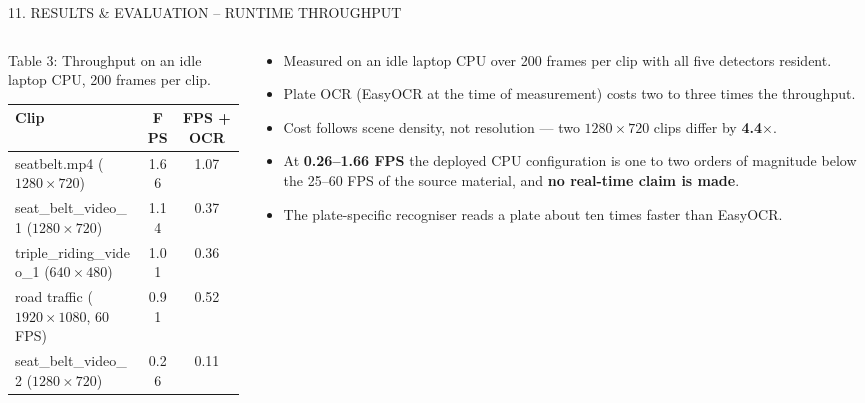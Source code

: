 \documentclass[aspectratio=169,10pt,t]{beamer}
\begin{document}
\begin{frame}{11. RESULTS \& EVALUATION -- RUNTIME THROUGHPUT}
\begin{columns}[T,onlytextwidth]
\begin{column}{0.5\textwidth}
\centering
{\tiny Table 3: Throughput on an idle laptop CPU, 200 frames per clip.}\\[0.2em]
\scriptsize
\begin{tabular}{@{}lcc@{}}
\toprule
\textbf{Clip} & \textbf{FPS} & \textbf{FPS + OCR}\\
\midrule
seatbelt.mp4 ($1280\times720$) & 1.66 & 1.07\\
seat\_belt\_video\_1 ($1280\times720$) & 1.14 & 0.37\\
triple\_riding\_video\_1 ($640\times480$) & 1.01 & 0.36\\
road traffic ($1920\times1080$, 60 FPS) & 0.91 & 0.52\\
seat\_belt\_video\_2 ($1280\times720$) & 0.26 & 0.11\\
\bottomrule
\end{tabular}
\end{column}
\begin{column}{0.47\textwidth}
\scriptsize
\begin{itemize}\setlength{\itemsep}{0.3em}
  \item Measured on an idle laptop CPU over 200 frames per clip with all five detectors resident.
  \item Plate OCR (EasyOCR at the time of measurement) costs two to three times the throughput.
  \item Cost follows scene density, not resolution --- two $1280\times720$ clips differ by \textbf{4.4$\times$}.
  \item At \textbf{0.26--1.66 FPS} the deployed CPU configuration is one to two orders of magnitude below the
        25--60 FPS of the source material, and \textbf{no real-time claim is made}.
  \item The plate-specific recogniser reads a plate about ten times faster than EasyOCR.
\end{itemize}
\end{column}
\end{columns}
\end{frame}
\end{document}
